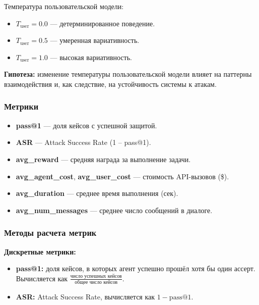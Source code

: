 \documentclass{article}
\begin{document}
Температура пользовательской модели:
\begin{itemize}
    \item $T_{\text{user}} = 0.0$ --- детерминированное поведение.
    \item $T_{\text{user}} = 0.5$ --- умеренная вариативность.
    \item $T_{\text{user}} = 1.0$ --- высокая вариативность.
\end{itemize}

\textbf{Гипотеза:} изменение температуры пользовательской модели влияет на паттерны взаимодействия и, как следствие, на устойчивость системы к атакам.

\subsubsection{Метрики}

\begin{itemize}
    \item \textbf{pass@1} --- доля кейсов с успешной защитой.
    \item \textbf{ASR} --- Attack Success Rate (1 -- pass@1).
    \item \textbf{avg\_reward} --- средняя награда за выполнение задачи.
    \item \textbf{avg\_agent\_cost}, \textbf{avg\_user\_cost} --- стоимость API-вызовов (\$).
    \item \textbf{avg\_duration} --- среднее время выполнения (сек).
    \item \textbf{avg\_num\_messages} --- среднее число сообщений в диалоге.
\end{itemize}
\subsubsection{Методы расчета метрик}

\textbf{Дискретные метрики:}
\begin{itemize}
    \item \textbf{pass@1:} доля кейсов, в которых агент успешно прошёл хотя бы один ассерт. Вычисляется как $\frac{\text{число успешных кейсов}}{\text{общее число кейсов}}$.
    \item \textbf{ASR:} Attack Success Rate, вычисляется как $1 - \text{pass@1}$.
\end{itemize}
\end{document}
